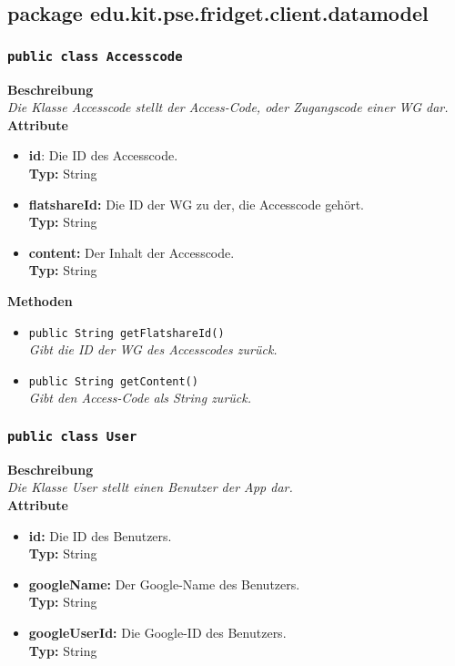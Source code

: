 \subsection{package edu.kit.pse.fridget.client.datamodel}
\subsubsection{\texttt{public class Accesscode}}

	\textbf{Beschreibung} \\
	\textit{Die Klasse Accesscode stellt der Access-Code, oder Zugangscode einer WG dar.} \\
	
	\textbf{Attribute}
	\begin{itemize}
		\item \textbf{id}: Die ID des Accesscode. \\
		\textbf{Typ:} String
		
		\item \textbf{flatshareId:} Die ID der WG zu der, die Accesscode gehört. \\
		\textbf{Typ:} String

		\item \textbf{content:} Der Inhalt der Accesscode.\\
		\textbf{Typ:} String
	\end{itemize}

	\textbf{Methoden}
	\begin{itemize}
		\item{\texttt{public String getFlatshareId()}}\\
		\textit{Gibt die ID der WG des Accesscodes zurück.}\\
		\item{\texttt{public String getContent()}}\\
		\textit{Gibt den Access-Code als String zurück.}\\
	\end{itemize}

	

\subsubsection{\texttt{public class User}}

	\textbf{Beschreibung} \\
	\textit{Die Klasse User stellt einen Benutzer der App dar.}\\
	
	\textbf{Attribute}
	\begin{itemize}
		\item \textbf{id:} Die ID des Benutzers. \\
		\textbf{Typ:} String
		\item \textbf{googleName:} Der Google-Name des Benutzers. \\
		\textbf{Typ:} String
		\item \textbf{googleUserId:} Die Google-ID des Benutzers. \\
		\textbf{Typ:} String
	\end{itemize}

